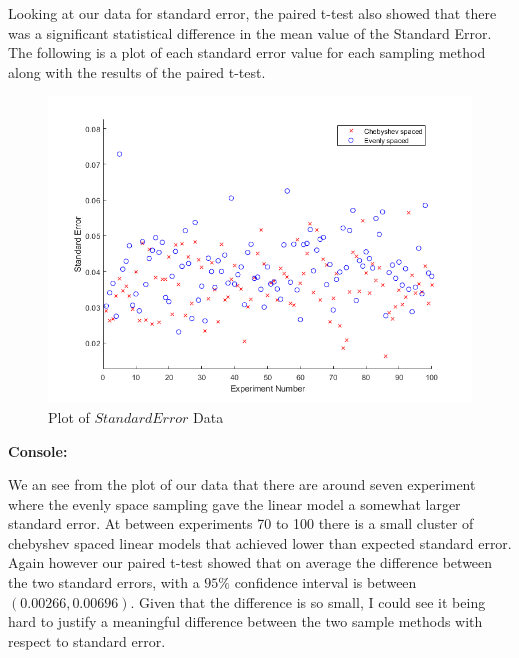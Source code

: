 \documentclass[12pt]{article}
\theoremstyle{homework}
\begin{document}
  Looking at our data for standard error, the paired t-test also showed that there was a significant statistical difference in the mean value of the Standard Error. The following is a plot of 
  each standard error value for each sampling method along with the results of the paired t-test.\\ 
  \begin{figure}[H]
    \caption{Plot of $Standard Error$ Data}
    \includegraphics[width = \textwidth]{stderror.png}  
    \centering
  \end{figure}
  \textbf{Console:}
  \begin{center}
  
  \end{center}

  We an see from the plot of our data that there are around seven experiment where the evenly space sampling gave the linear model
  a somewhat larger standard error. At between experiments 70 to 100 there is a small cluster of chebyshev spaced linear models that achieved
  lower than expected standard error. Again however our paired t-test showed that on average the difference between the two standard errors, with a 
  $95\%$ confidence interval is between $(0.00266, 0.00696)$. Given that the difference is so small, I could see it being hard to justify a meaningful difference
  between the two sample methods with respect to standard error. \\\\
\end{document}
